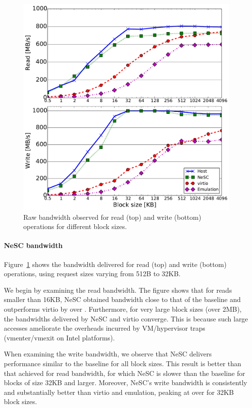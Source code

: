 \begin{figure}[t]
  \centering
  \includegraphics[width=1\columnwidth]{figs/throughput_block_size.pdf}
  \caption{Raw bandwidth observed for read (top) and write (bottom) operations for different block sizes.}
  \label{fig:bw}
\end{figure}

\paragraph{NeSC bandwidth}
Figure~\ref{fig:bw} shows the bandwidth delivered for read (top) and write (bottom) operations, using request sizes varying from 512B to 32KB.

We begin by examining the read bandwidth.
%
The figure shows that for reads smaller than 16KB, NeSC obtained bandwidth close to that of the baseline and outperforms virtio by over .
%
Furthermore, for very large block sizes (over 2MB), the bandwidths delivered by NeSC and virtio converge. This is because such large accesses ameliorate the overheads incurred by VM/hypervisor traps (vmenter/vmexit on Intel platforms).

When examining the write bandwidth, we observe that NeSC delivers performance similar to the baseline for all block sizes. This result is better than that achieved for read bandwidth, for which NeSC is \tilde{} slower than  the baseline for blocks of size 32KB and larger. Moreover, NeSC's write bandwidth is consistently and substantially better than virtio and emulation, peaking at over  for 32KB block sizes.


